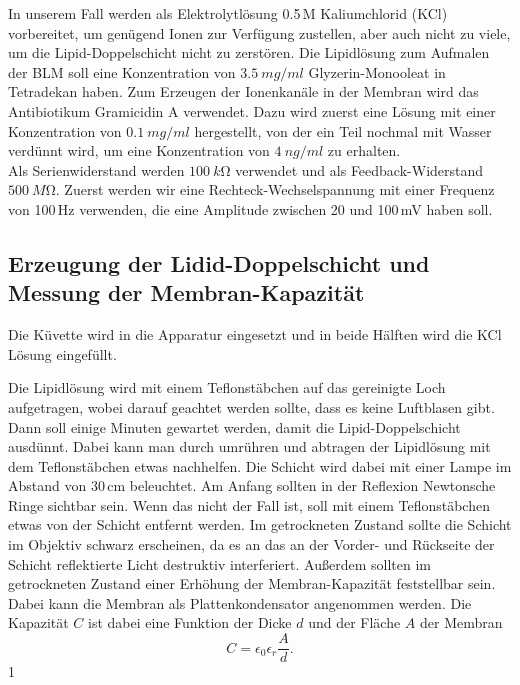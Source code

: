 \documentclass[a4paper,ngerman]{scrartcl}
\begin{document}
In unserem Fall werden als Elektrolytlösung 0.5\,M Kaliumchlorid (KCl) vorbereitet, um genügend Ionen zur Verfügung zustellen, aber auch nicht zu viele, um die Lipid-Doppelschicht nicht zu zerstören. Die Lipidlösung zum Aufmalen der BLM soll eine Konzentration von 
$\SI{3,5}{mg/ml}$ Glyzerin-Monooleat in Tetradekan haben. Zum Erzeugen der Ionenkanäle in der Membran wird das Antibiotikum Gramicidin A verwendet. Dazu wird zuerst eine
Lösung mit einer Konzentration von $\SI{0,1}{mg/ml}$ hergestellt, von der ein Teil nochmal mit Wasser verdünnt wird, um eine Konzentration von
$\SI{4}{ng/ml}$ zu erhalten. \\

Als Serienwiderstand werden $\SI{100}{k\ohm}$ verwendet und als Feedback-Widerstand $\SI{500}{M\ohm}$. Zuerst werden wir eine 
Rechteck-Wechselspannung mit einer Frequenz von 100\,Hz verwenden, die eine Amplitude zwischen 20 und 100\,mV haben soll. \\



\subsection{Erzeugung der Lidid-Doppelschicht und Messung der Membran-Kapazität}
\label{sec:capacity}
Die Küvette wird in die Apparatur eingesetzt und in beide Hälften wird
die KCl Lösung eingefüllt.

Die Lipidlösung wird mit einem Teflonstäbchen auf das gereinigte Loch aufgetragen, wobei darauf geachtet werden sollte, dass es keine Luftblasen gibt.
Dann soll einige Minuten gewartet werden, damit die Lipid-Doppelschicht ausdünnt.
Dabei kann man durch umrühren und abtragen der Lipidlösung mit dem Teflonstäbchen etwas nachhelfen.
Die Schicht wird dabei mit einer Lampe im Abstand
von 30\,cm beleuchtet. Am Anfang sollten in der Reflexion Newtonsche Ringe sichtbar sein. Wenn das nicht der Fall ist, soll mit einem
Teflonstäbchen etwas von der Schicht entfernt werden. Im getrockneten Zustand sollte die Schicht im Objektiv schwarz erscheinen, da es 
an das an der Vorder- und Rückseite der Schicht reflektierte Licht destruktiv interferiert. Außerdem sollten im getrockneten Zustand 
einer Erhöhung der Membran-Kapazität feststellbar sein. Dabei kann die Membran als Plattenkondensator angenommen werden. Die Kapazität $C$
ist dabei eine Funktion der Dicke $d$ und der Fläche $A$ der Membran
\begin{equation}
C = \epsilon_0 \epsilon_r \frac{A}{d}.
\end{equation}1
\end{document}
